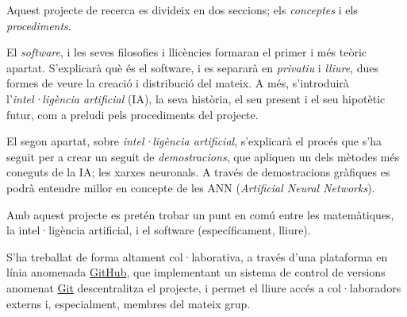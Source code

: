 Aquest projecte de recerca es divideix en dos seccions; els \emph{conceptes}
i els \emph{procediments}.

El \emph{software}, i les seves filosofies i llicències formaran el primer i més
teòric apartat. S'explicarà què és el software, i es separarà en \emph{privatiu}
i \emph{lliure}, dues formes de veure la creació i distribució del mateix. A més,
s'introduirà l'\emph{intel·ligència artificial} (IA), la seva història, el seu present i el
seu hipotètic futur, com a preludi pels procediments del projecte.

El segon apartat, sobre \emph{intel·ligència artificial}, s'explicarà el procés
que s'ha seguit per a crear un seguit de \emph{demostracions}, que apliquen un
dels mètodes més coneguts de la IA; les xarxes neuronals. A través de demostracions
gràfiques es podrà entendre millor en concepte de les ANN (\emph{Artificial Neural Networks}).

Amb aquest projecte es pretén trobar un punt en comú entre les matemàtiques,
la intel·ligència artificial, i el software (específicament, lliure).

S'ha treballat de forma altament col·laborativa, a través d'una plataforma
en línia anomenada \href{http://github.com}{GitHub}, que implementant un sistema
de control de versions anomenat \href{http://git-scm.com/}{Git} descentralitza
el projecte, i permet el lliure accés a col·laboradors externs i, especialment, membres
del mateix grup.